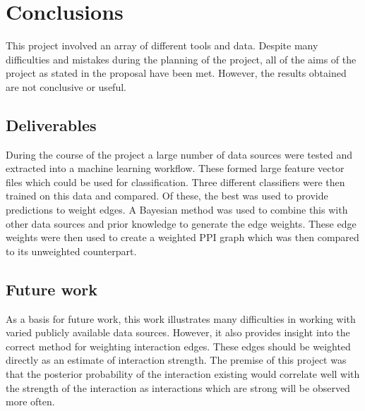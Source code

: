\chapter{Conclusions}
\label{conclusion}

This project involved an array of different tools and data.
Despite many difficulties and mistakes during the planning of the project, all of the aims of the project as stated in the proposal have been met.
However, the results obtained are not conclusive or useful.


\section{Deliverables}
During the course of the project a large number of data sources were tested and extracted into a machine learning workflow.
These formed large feature vector files which could be used for classification.
Three different classifiers were then trained on this data and compared.
Of these, the best was used to provide predictions to weight edges.
A Bayesian method was used to combine this with other data sources and prior knowledge to generate the edge weights.
These edge weights were then used to create a weighted \ac{PPI} graph which was then compared to its unweighted counterpart.




\section{Future work}
As a basis for future work, this work illustrates many difficulties in working with varied publicly available data sources.
However, it also provides insight into the correct method for weighting interaction edges.
These edges should be weighted directly as an estimate of interaction strength.
The premise of this project was that the posterior probability of the interaction existing would correlate well with the strength of the interaction as interactions which are strong will be observed more often.

